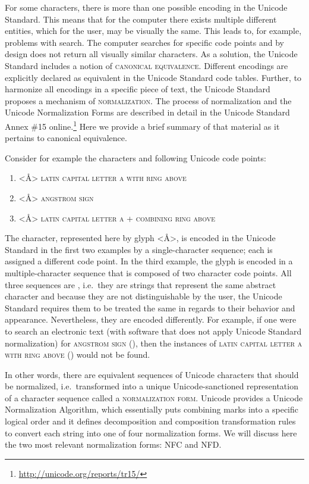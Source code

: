 For some characters, there is more than one possible encoding in the Unicode
Standard. This means that for the computer
there exists multiple different entities, which for the user, may be visually the same. This
leads to, for example, problems with search. The computer searches for specific 
code points and by design does not return all visually similar characters.
As a solution, the Unicode Standard includes a notion of \textsc{canonical
equivalence}. Different encodings are explicitly declared as equivalent in the
Unicode Standard code tables. Further, to harmonize all encodings in a specific
piece of text, the Unicode Standard proposes a mechanism of
\textsc{normalization}. The process of normalization and the 
Unicode Normalization Forms are described 
in detail in the Unicode Standard Annex \#15 online.\footnote{\url{http://unicode.org/reports/tr15/}} 
Here we provide a brief summary of that material as it pertains to canonical equivalence.

Consider for example the characters and following Unicode code points:
\begin{enumerate}
	\def\labelenumi{\arabic{enumi}.} 
	\item <Å> \textsc{latin capital letter a with ring above}  
	\item <Å> \textsc{angstrom sign} 
	\item <Å> \textsc{latin capital letter a} 
	+ \textsc{combining ring above} 
\end{enumerate}

\noindent The character, represented here by glyph <Å>, is encoded in the Unicode Standard
in the first two examples by a single-character sequence; each is assigned a
different code point. In the third example, the glyph is encoded in a
multiple-character sequence that is composed of two character code points. All
three sequences are \textsc{}, i.e.~they are strings that
represent the same abstract character and because they are not distinguishable
by the user, the Unicode Standard requires them to be treated the same in
regards to their behavior and appearance. Nevertheless, they are encoded
differently. For example, if one were to search an electronic text (with
software that does not apply Unicode Standard normalization) for
\textsc{angstrom sign} (), then the instances of \textsc{latin 
capital letter a with ring above} () would not be found.

In other words, there are equivalent sequences of Unicode characters that should
be normalized, i.e.~transformed into a unique Unicode-sanctioned representation
of a character sequence called a \textsc{normalization form}. Unicode provides a
Unicode Normalization Algorithm, which essentially puts combining marks
into a specific logical order and it defines decomposition and composition
transformation rules to convert each string into one of four normalization
forms. We will discuss here the two most relevant normalization forms: NFC and
NFD.\@

